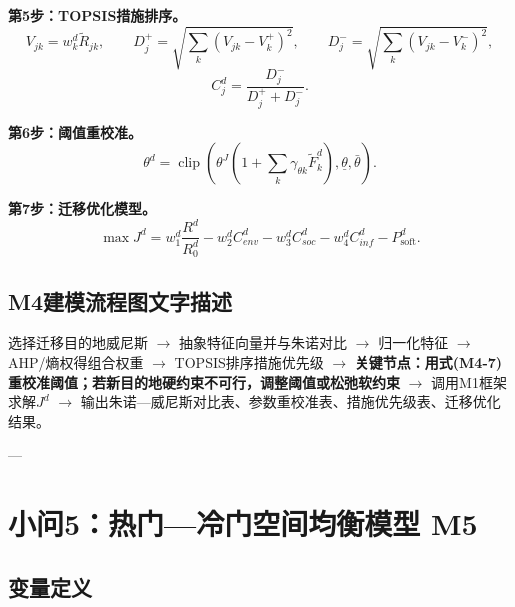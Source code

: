 \documentclass[UTF8,a4paper,12pt]{ctexart}
\begin{document}
\textbf{第5步：TOPSIS措施排序。}
\begin{equation}\tag{M4-5}
V_{jk}=w_k^d\tilde R_{jk},\qquad D_j^+=\sqrt{\sum_k(V_{jk}-V_k^+)^2},\qquad D_j^-=\sqrt{\sum_k(V_{jk}-V_k^-)^2},
\end{equation}
\begin{equation}\tag{M4-6}
C_j^d=\frac{D_j^-}{D_j^++D_j^-}.
\end{equation}

\textbf{第6步：阈值重校准。}
\begin{equation}\tag{M4-7}
\theta^d=\operatorname{clip}\left(\theta^J\left(1+\sum_k\gamma_{\theta k}\tilde F_k^d\right),\underline\theta,\bar\theta\right).
\end{equation}

\textbf{第7步：迁移优化模型。}
\begin{equation}\tag{M4-8}
\max J^d=w_1^d\frac{R^d}{R_0^d}-w_2^dC_{env}^d-w_3^dC_{soc}^d-w_4^dC_{inf}^d-P_{\mathrm{soft}}^d.
\end{equation}

\subsection{M4建模流程图文字描述}

选择迁移目的地威尼斯 \(\rightarrow\) 抽象特征向量并与朱诺对比 \(\rightarrow\) 归一化特征 \(\rightarrow\) AHP/熵权得组合权重 \(\rightarrow\) TOPSIS排序措施优先级 \(\rightarrow\) \textbf{关键节点：用式(M4-7)重校准阈值；若新目的地硬约束不可行，调整阈值或松弛软约束} \(\rightarrow\) 调用M1框架求解\(J^d\) \(\rightarrow\) 输出朱诺—威尼斯对比表、参数重校准表、措施优先级表、迁移优化结果。

---

\section{小问5：热门—冷门空间均衡模型 M5}

\subsection{变量定义}
\end{document}
